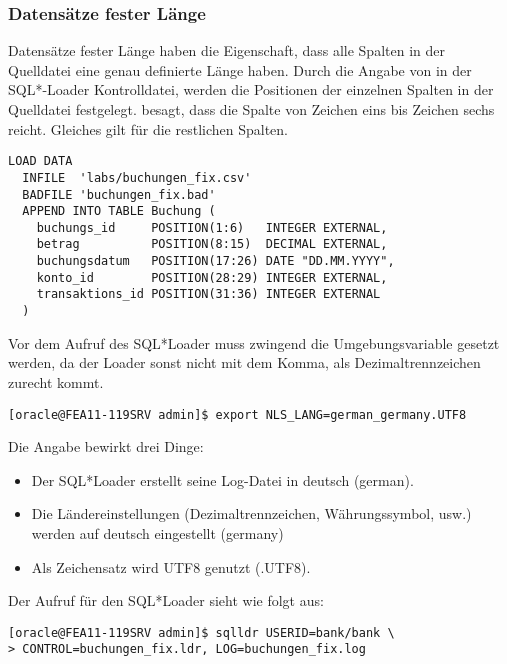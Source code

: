         \subsubsection{Datens\"atze fester L\"ange}
          Datens\"atze fester L\"ange haben die Eigenschaft, dass alle Spalten in der Quelldatei eine genau definierte L\"ange haben. Durch die Angabe von  in der SQL*-Loader Kontrolldatei, werden die Positionen der einzelnen Spalten in der Quelldatei festgelegt.  besagt, dass die Spalte  von Zeichen eins bis Zeichen sechs reicht. Gleiches gilt f\"ur die restlichen Spalten.
\clearpage
          \begin{lstlisting}[caption={Datens\"atze fester L\"ange- Die Kontrolldatei \oscommand{buchungen\_fix.ldr}},label=admin921,language=configfile]
LOAD DATA
  INFILE  'labs/buchungen_fix.csv'
  BADFILE 'buchungen_fix.bad'
  APPEND INTO TABLE Buchung (
    buchungs_id     POSITION(1:6)   INTEGER EXTERNAL,
    betrag          POSITION(8:15)  DECIMAL EXTERNAL,
    buchungsdatum   POSITION(17:26) DATE "DD.MM.YYYY",
    konto_id        POSITION(28:29) INTEGER EXTERNAL,
    transaktions_id POSITION(31:36) INTEGER EXTERNAL
  )
          \end{lstlisting}
          Vor dem Aufruf des SQL*Loader muss zwingend die Umgebungsvariable  gesetzt werden, da der Loader sonst nicht mit dem Komma, als Dezimaltrennzeichen zurecht kommt.
          \begin{lstlisting}[caption={Den SQL*Loader benutzen},label=admin921b,language=expdp_impdp,emph={[9]LOG},emphstyle={[9]\sffamily\color{blue}}]
[oracle@FEA11-119SRV admin]$ export NLS_LANG=german_germany.UTF8
          \end{lstlisting}
          Die Angabe  bewirkt drei Dinge:
          \begin{itemize}
            \item Der SQL*Loader erstellt seine Log-Datei in deutsch (german).
            \item Die L\"andereinstellungen (Dezimaltrennzeichen, W\"ahrungssymbol, usw.) werden auf deutsch eingestellt (germany)
            \item Als Zeichensatz wird UTF8 genutzt (.UTF8).
          \end{itemize}
          Der Aufruf f\"ur den SQL*Loader sieht wie folgt aus:
          \begin{lstlisting}[caption={Den SQL*Loader benutzen},label=admin921a,language=expdp_impdp,emph={[9]LOG},emphstyle={[9]\sffamily\color{blue}}]
[oracle@FEA11-119SRV admin]$ sqlldr USERID=bank/bank \
> CONTROL=buchungen_fix.ldr, LOG=buchungen_fix.log
          \end{lstlisting}
